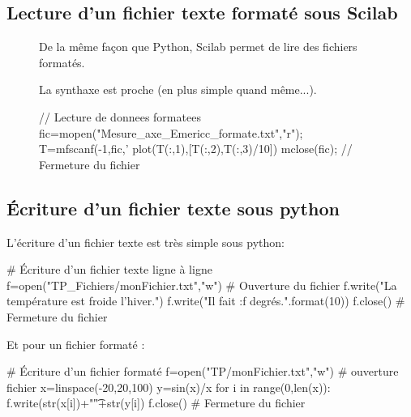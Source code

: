 \documentclass[10pt,fleqn]{article} %
\begin{document}
\subsection{Lecture d'un fichier texte formaté sous Scilab}

\begin{figure}[h]
\begin{minipage}[c]{.49\linewidth}


De la même façon que Python, Scilab permet de lire des fichiers formatés.

La synthaxe est proche (en plus simple quand même...).

\end{minipage} \hfill
\begin{minipage}[c]{.49\linewidth}
\begin{sci}
\begin{scilab}[h]
// Lecture de donnees formatees
fic=mopen("Mesure_axe_Emericc_formate.txt","r");
T=mfscanf(-1,fic,'%
plot(T(:,1),[T(:,2),T(:,3)/10])
mclose(fic);               // Fermeture du fichier
\end{scilab}
\end{sci}
\end{minipage}
\end{figure}




\subsection{Écriture d'un fichier texte sous python}
L'écriture d'un fichier texte est très simple sous python:
\begin{py}
\begin{python}[h]
# Écriture d'un fichier texte ligne à ligne
f=open("TP_Fichiers/monFichier.txt","w")  # Ouverture du fichier
f.write("La température est froide l'hiver.\n")
f.write("Il fait {:f} degrés.".format(10))
f.close()        # Fermeture du fichier
\end{python}
\end{py}

Et pour un fichier formaté :
\begin{py}
\begin{python}[h]
# Écriture d'un fichier formaté
f=open("TP/monFichier.txt","w")  # ouverture fichier
x=linspace(-20,20,100)
y=sin(x)/x
for i in range(0,len(x)):
    f.write(str(x[i])+"\t"+str(y[i])
f.close()        # Fermeture du fichier
\end{python}
\end{py}
\end{document}
